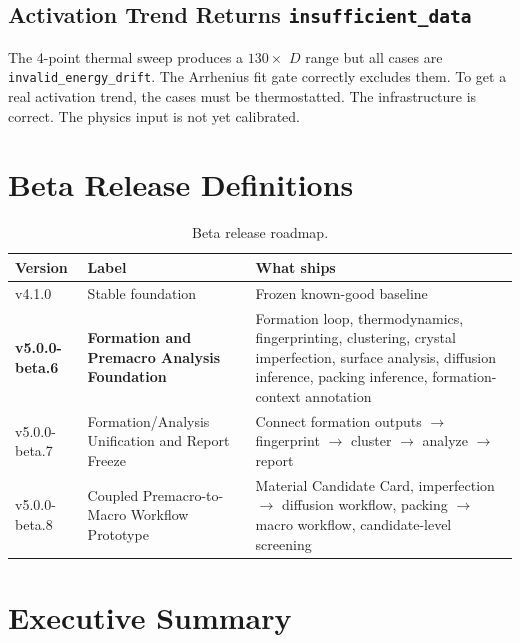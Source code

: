 \documentclass[11pt,a4paper]{article}
\begin{document}
\subsection{Activation Trend Returns \texttt{insufficient\_data}}

The 4-point thermal sweep produces a $130\times$ $D$ range but all cases are
\texttt{invalid\_energy\_drift}. The Arrhenius fit gate correctly excludes them. To get a real
activation trend, the cases must be thermostatted. The infrastructure is correct. The physics
input is not yet calibrated.

\section{Beta Release Definitions}

\begin{table}[h!]
\centering
\begin{tabularx}{\linewidth}{llX}
\toprule
\textbf{Version} & \textbf{Label} & \textbf{What ships} \\
\midrule
v4.1.0 & Stable foundation & Frozen known-good baseline \\
\textbf{v5.0.0-beta.6} & \textbf{Formation and Premacro Analysis Foundation} & Formation loop, thermodynamics, fingerprinting, clustering, crystal imperfection, surface analysis, diffusion inference, packing inference, formation-context annotation \\
v5.0.0-beta.7 & Formation/Analysis Unification and Report Freeze & Connect formation outputs $\to$ fingerprint $\to$ cluster $\to$ analyze $\to$ report \\
v5.0.0-beta.8 & Coupled Premacro-to-Macro Workflow Prototype & Material Candidate Card, imperfection $\to$ diffusion workflow, packing $\to$ macro workflow, candidate-level screening \\
\bottomrule
\end{tabularx}
\caption{Beta release roadmap.}
\end{table}

\section{Executive Summary}
\end{document}

